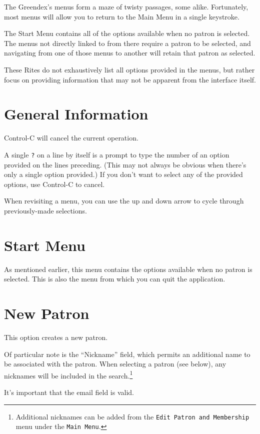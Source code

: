 \documentclass[12pt]{article}
\begin{document}
The Greendex's menus form a maze of twisty passages, some alike.
Fortunately, most menus will allow you to return to the Main Menu in a
single keystroke.

The Start Menu contains all of the options available when no patron is
selected.  The menus not directly linked to from there require a patron
to be selected, and navigating from one of those menus to another will
retain that patron as selected.

These Rites do not exhaustively list all options provided in the menus,
but rather focus on providing information that may not be apparent
from the interface itself.

\section{General Information}

Control-C will cancel the current operation.

A single \texttt{?} on a line by itself is a prompt to type the number
of an option provided on the lines preceding.  (This may not always be
obvious when there's only a single option provided.)  If you don't want
to select any of the provided options, use Control-C to cancel.

When revisiting a menu, you can use the up and down arrow to cycle
through previously-made selections.

\section{Start Menu}

As mentioned earlier, this menu contains the options available when
no patron is selected.  This is also the menu from which you can quit the
application.

\section{New Patron}

This option creates a new patron.

Of particular note is the ``Nickname'' field, which permits an
additional name to be associated with the patron.  When selecting a patron
(see below), any nicknames will be included in the search.\footnote{Additional
nicknames can be added from the \texttt{Edit Patron and Membership} menu
under the \texttt{Main Menu}.}

It's important that the email field is valid.
\end{document}
